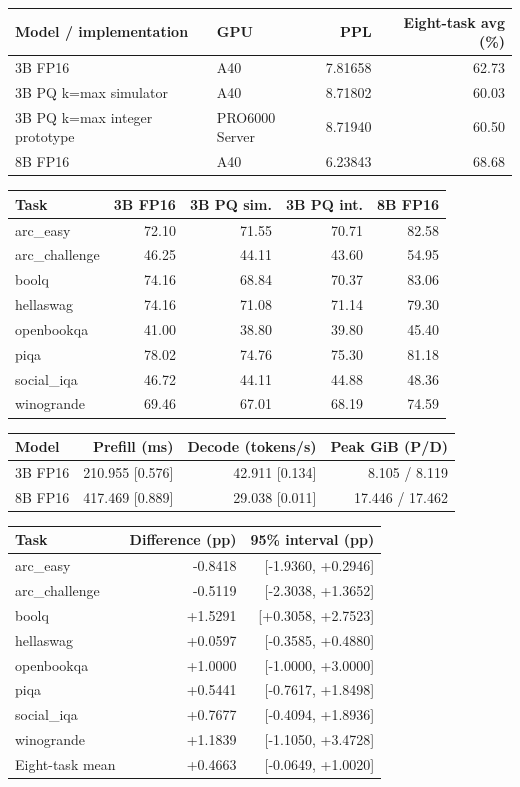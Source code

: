 \begin{tabular}{llrr}
\toprule
Model / implementation & GPU & PPL & Eight-task avg (\%) \\
\midrule
3B FP16 & A40 & 7.81658 & 62.73 \\
3B PQ k=max simulator & A40 & 8.71802 & 60.03 \\
3B PQ k=max integer prototype & PRO6000 Server & 8.71940 & 60.50 \\
8B FP16 & A40 & 6.23843 & 68.68 \\
\bottomrule
\end{tabular}

\begin{tabular}{lrrrr}
\toprule
Task & 3B FP16 & 3B PQ sim. & 3B PQ int. & 8B FP16 \\
\midrule
arc\_easy & 72.10 & 71.55 & 70.71 & 82.58 \\
arc\_challenge & 46.25 & 44.11 & 43.60 & 54.95 \\
boolq & 74.16 & 68.84 & 70.37 & 83.06 \\
hellaswag & 74.16 & 71.08 & 71.14 & 79.30 \\
openbookqa & 41.00 & 38.80 & 39.80 & 45.40 \\
piqa & 78.02 & 74.76 & 75.30 & 81.18 \\
social\_iqa & 46.72 & 44.11 & 44.88 & 48.36 \\
winogrande & 69.46 & 67.01 & 68.19 & 74.59 \\
\bottomrule
\end{tabular}

\begin{tabular}{lrrr}
\toprule
Model & Prefill (ms) & Decode (tokens/s) & Peak GiB (P/D) \\
\midrule
3B FP16 & 210.955 [0.576] & 42.911 [0.134] & 8.105 / 8.119 \\
8B FP16 & 417.469 [0.889] & 29.038 [0.011] & 17.446 / 17.462 \\
\bottomrule
\end{tabular}

\begin{tabular}{lrr}
\toprule
Task & Difference (pp) & 95\% interval (pp) \\
\midrule
arc\_easy & -0.8418 & [-1.9360, +0.2946] \\
arc\_challenge & -0.5119 & [-2.3038, +1.3652] \\
boolq & +1.5291 & [+0.3058, +2.7523] \\
hellaswag & +0.0597 & [-0.3585, +0.4880] \\
openbookqa & +1.0000 & [-1.0000, +3.0000] \\
piqa & +0.5441 & [-0.7617, +1.8498] \\
social\_iqa & +0.7677 & [-0.4094, +1.8936] \\
winogrande & +1.1839 & [-1.1050, +3.4728] \\
Eight-task mean & +0.4663 & [-0.0649, +1.0020] \\
\bottomrule
\end{tabular}
